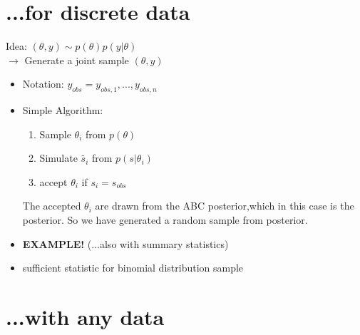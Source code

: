 \documentclass[10pt,a4paper]{report}
\begin{document}
\section{...for discrete data}

Idea: $(\theta,y) \sim p(\theta)p(y|\theta) $\\
$\rightarrow$ Generate a joint sample $(\theta,y)$
\begin{itemize}
\item Notation: $y_{obs}={y_{obs,1},...,y_{obs,n}}$



\item Simple Algorithm: 
\begin{enumerate}
\item Sample  $\theta_i$ from  $p(\theta)$
\item Simulate $\tilde{s_i}$ from $p(s|\theta_i)$
\item accept $\theta_i$ if $s_i=s_{obs}$ 
\end{enumerate} 
The accepted $\theta_i$ are drawn from the ABC posterior,which in this case is the posterior. So we have generated a random sample from posterior.
\item \textbf{EXAMPLE!} (...also with summary statistics)
\item sufficient statistic for binomial distribution sample

\end{itemize}


\section{...with any data}
\end{document}
